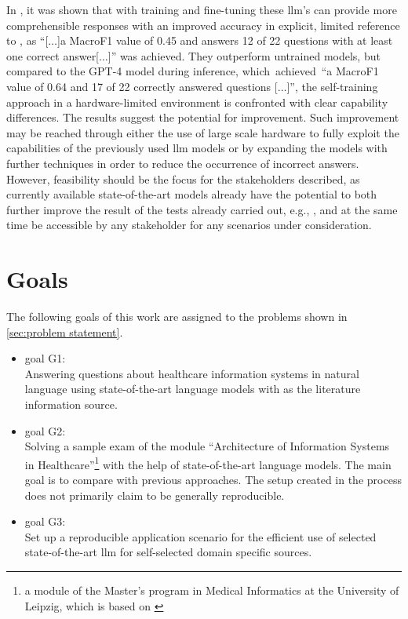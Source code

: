 In \citet{Paul_Keller}, it was shown that with training and fine-tuning these \ac{llm}'s can provide more comprehensible responses with an improved accuracy in explicit, limited reference to \citet{bb2}, as \enquote{[$\dots$]a MacroF1 value of \num{0.45} and answers \num{12} of \num{22} questions with at least one correct answer[$\dots$]}\citep{Paul_Keller} was achieved.
They outperform untrained models, but compared to the GPT-4 model during inference, which~achieved~\enquote{a MacroF1 value of \num{0.64} and \num{17} of \num{22} correctly answered questions [$\dots$]}\citep{Paul_Keller}, the self-training approach in a hardware-limited environment is confronted with clear capability differences.
%
The results suggest the potential for improvement. 
Such improvement may be reached through either the use of large scale hardware to fully exploit the capabilities of the previously used \ac{llm} models or by expanding the models with further techniques in order to reduce the occurrence of incorrect answers.\\
%
However, feasibility should be the focus for the stakeholders described, as currently available state-of-the-art models already have the potential to both further improve the result of the tests already carried out, e.g., \citet{Paul_Keller}, and at the same time be accessible by any stakeholder for any scenarios under consideration.

\section{Goals}\label{sec:goals}
The following goals of this work are assigned to the problems shown in \cref{sec:problem statement}.
\begin{itemize}
  \item goal G1:\\
    Answering questions about healthcare information systems in natural language using state-of-the-art language models with \citet{bb2} as the literature information source. 
  \item goal G2:\\
   Solving a sample exam of the module \enquote{Architecture of Information Systems in Healthcare}\footnote{\raggedright{}a module of the Master's program in Medical Informatics at the University of Leipzig, which is based on \citet{bb2}} with the help of state-of-the-art language models.
   The main goal is to compare with previous approaches.
   The setup created in the process does not primarily claim to be generally reproducible.
   \item goal G3:\\
   Set up a reproducible application scenario for the efficient use of selected state-of-the-art \ac{llm} for self-selected domain specific sources.
\end{itemize}
